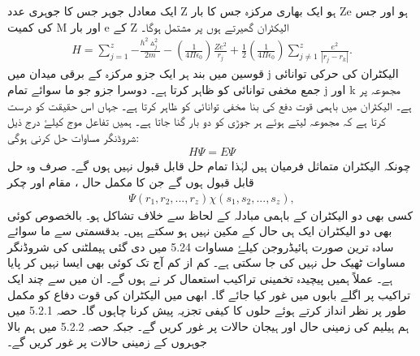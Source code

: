 ایک معادل جوہر جس کا جوہری عدد Z ہو ایک بھاری مرکزہ جس کا بار Ze ہو اور جس کی کمیت M اور بار e کے Z الیکٹران گھیرتے  ہوں پر مشتمل ہوگا۔
\begin{align}
H=\sum_{j=1}^{z} { -\frac{h^2 \vartriangle^2 _{j} }{2m}-(\frac{1}{4\Pi\epsilon_{0}})  \frac{Ze^2}{r_{j}} } + \frac{1}{2}(\frac{1}{4\Pi\epsilon_{0}}) \sum_{j\neq 1}^{z} \frac{e^2}{|r_{j} - r_{k} |}. 
\end{align}
 قوسین میں بند ہر ایک  جزو مرکزہ کے برقی میدان میں j الیکٹران کی حرکی توانائی جمع مخفی توانائی کو ظاہر کرتا ہے۔ دوسرا جزو جو  ما سوائے  تمام j اور k مجموعہ پر ہے۔ الیکٹران  میں باہمی قوت دفع کی بنا مخفی توانائی کو ظاہر کرتا ہے۔ جہاں  اس حقیقت کو درست کرتا ہے کہ مجموعہ لیتے ہوئے ہر جوڑی کو دو بار گنا جاتا ہے۔ ہمیں تفاعل موج  کیلۓ درج ذیل شروڈنگر مساوات حل کرنی ہوگی:
\begin{align}
 H\Psi=E\Psi
\end{align}
چونکہ الیکٹران متماثل فرمیان ہیں لہٰذا تمام حل قابل قبول نہیں ہوں گے۔ صرف وہ حل قابل قبول ہوں گے جن کا مکمل حال ، مقام اور چکر 
\begin{align}
 \Psi(r_{1},r_{2},...,r_{z}) \chi(s_{1},s_{2},...,s_{z}), 
\end{align}
کسی بھی دو الیکٹران کے باہمی مبادلہ کے لحاظ سے خلاف تشاکل ہو۔ بالخصوص کوئی بھی دو الیکٹران ایک ہی حال کے مکین نہیں ہو سکتے ہیں۔ بدقسمتی سے ما سوائے سادہ ترین صورت   ہائیڈروجن کیلۓ مساوات 5.24 میں دی گئی ہیملٹنی کی شروڈنگر مساوات ٹھیک حل نہیں کی جا سکتی ہے۔ کم از کم آج تک کوئی بھی ایسا نہیں کر پایا ہے۔ عملاً ہمیں پیچیدہ تخمینی تراکیب استعمال کر نے ہوں گے۔ ان میں سے چند ایک تراکیب پر اگلے بابوں میں غور کیا جائے گا۔ ابھی میں الیکٹران کی قوت دفاع کو مکمل طور پر نظر انداز کرتے ہوئے حلوں کا کیفی تجزیہ پیش کرنا چاہوں گا۔ حصہ 5.2.1 میں ہم ہیلیم کی زمینی حال اور ہیجان  حالات پر غور کریں گے۔ جبکہ حصہ 5.2.2 میں ہم بالا جوہروں  کے زمینی حالات پر غور کریں گے۔

